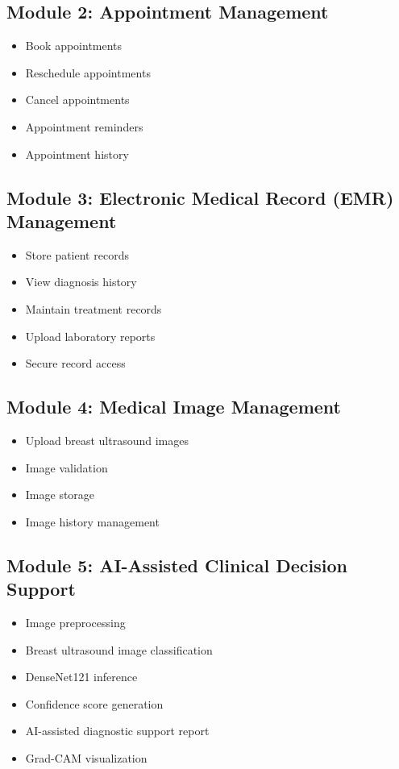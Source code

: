 \documentclass[12pt,a4paper]{report}
\begin{document}
\subsection*{Module 2: Appointment Management}
\begin{itemize}[noitemsep]
    \item Book appointments \item Reschedule appointments \item Cancel appointments \item Appointment reminders \item Appointment history
\end{itemize}

\subsection*{Module 3: Electronic Medical Record (EMR) Management}
\begin{itemize}[noitemsep]
    \item Store patient records \item View diagnosis history \item Maintain treatment records \item Upload laboratory reports \item Secure record access
\end{itemize}

\subsection*{Module 4: Medical Image Management}
\begin{itemize}[noitemsep]
    \item Upload breast ultrasound images \item Image validation \item Image storage \item Image history management
\end{itemize}

\subsection*{Module 5: AI-Assisted Clinical Decision Support}
\begin{itemize}[noitemsep]
    \item Image preprocessing \item Breast ultrasound image classification \item DenseNet121 inference \item Confidence score generation \item AI-assisted diagnostic support report \item Grad-CAM visualization
\end{itemize}
\end{document}
